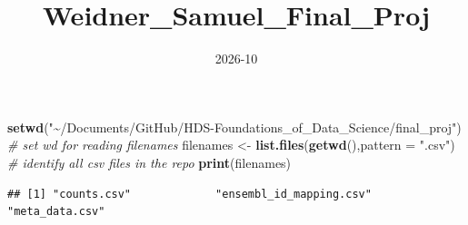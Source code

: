 \documentclass[
]{article}
\title{Weidner\_Samuel\_Final\_Proj}
\author{}
\date{\vspace{-2.5em}2026-10}
\newenvironment{Shaded}{\begin{snugshade}}{\end{snugshade}}
\newcommand{\AttributeTok}[1]{\textcolor[rgb]{0.13,0.29,0.53}{#1}}
\newcommand{\CommentTok}[1]{\textcolor[rgb]{0.56,0.35,0.01}{\textit{#1}}}
\newcommand{\FunctionTok}[1]{\textcolor[rgb]{0.13,0.29,0.53}{\textbf{#1}}}
\newcommand{\NormalTok}[1]{#1}
\newcommand{\OtherTok}[1]{\textcolor[rgb]{0.56,0.35,0.01}{#1}}
\newcommand{\StringTok}[1]{\textcolor[rgb]{0.31,0.60,0.02}{#1}}
\begin{document}
\maketitle

\begin{Shaded}
\begin{Highlighting}[]
\FunctionTok{setwd}\NormalTok{(}\StringTok{"\textasciitilde{}/Documents/GitHub/HDS{-}Foundations\_of\_Data\_Science/final\_proj"}\NormalTok{) }\CommentTok{\# set wd for reading filenames}
\NormalTok{filenames }\OtherTok{\textless{}{-}} \FunctionTok{list.files}\NormalTok{(}\FunctionTok{getwd}\NormalTok{(),}\AttributeTok{pattern =} \StringTok{".csv"}\NormalTok{) }\CommentTok{\# identify all csv files in the repo }
\FunctionTok{print}\NormalTok{(filenames)}
\end{Highlighting}
\end{Shaded}

\begin{verbatim}
## [1] "counts.csv"             "ensembl_id_mapping.csv" "meta_data.csv"
\end{verbatim}
\end{document}
